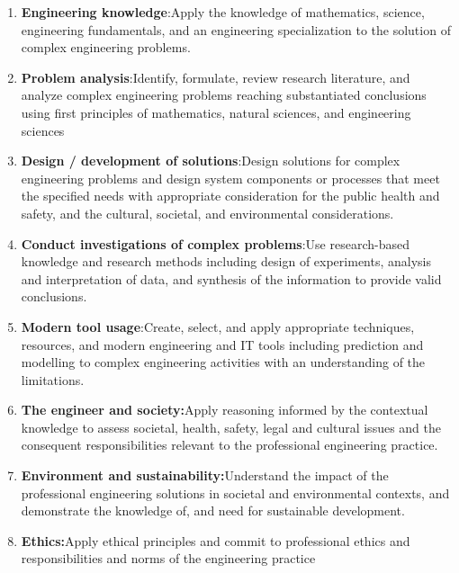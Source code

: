 \documentclass[10pt,a4paper]{report}
\begin{document}
\begin{center}
\begin{center}
\begin{enumerate}
	\item \textbf{\large Engineering knowledge}\large:Apply the knowledge of mathematics, science, engineering fundamentals, and an engineering specialization to the solution of complex engineering problems. ~
	\item \textbf{\large Problem analysis}\large:Identify, formulate, review research literature, and analyze complex engineering problems reaching substantiated conclusions using first principles of mathematics, natural sciences, and engineering sciences ~
	\item \textbf{\large Design / development of solutions}\large:Design solutions for complex engineering problems and design system components or processes that meet the specified needs with appropriate consideration for the public health and safety, and the cultural, societal, and environmental considerations.~
	\item \textbf{\large Conduct investigations of complex problems}\large:Use research-based knowledge and research methods including design of experiments, analysis and interpretation of data, and synthesis of the information to provide valid conclusions.~
	\item \textbf{\large Modern tool usage}\large:Create, select, and apply appropriate techniques, resources, and modern engineering and IT tools including prediction and modelling to complex engineering activities with an understanding of the limitations.~
	\item \textbf{\large The engineer and society:}\large Apply reasoning informed by the contextual knowledge to assess societal, health, safety, legal and cultural issues and the consequent responsibilities relevant to the professional engineering practice.~
	\item \textbf{\large Environment and sustainability:}\large Understand the impact of the professional engineering solutions in societal and environmental contexts, and demonstrate the knowledge of, and need for sustainable development.~
	\item \textbf{\large Ethics:}\large Apply ethical principles and commit to professional ethics and responsibilities and norms of the engineering practice

\end{enumerate}
\end{center}
\end{center}
\end{document}

